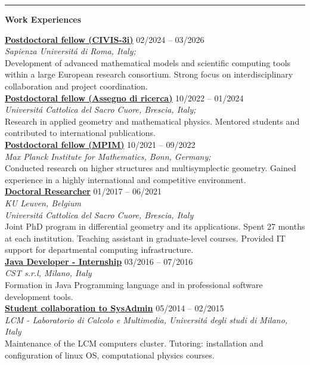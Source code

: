 \documentclass[a4paper]{article}
\newcommand{\block}[1]{\hrule \vspace{0.2cm} \textbf{\Large #1} \vspace{0.2cm}}
\newcommand{\voice}[5]{\href{#4}{\textbf{#1}} \hfill #2 \\ \textit{#3} \\ {\small #5} \vspace{0.2cm} \\}
\begin{document}
\begin{minipage}[t]{0.6\columnwidth}



    \block{Work Experiences}

    \voice{Postdoctoral fellow (CIVIS-3i)}
		{02/2024 -- 03/2026}
		{Sapienza Universit\'a di Roma, Italy;}
		{https://civis3i.univ-amu.fr/en/civis3i-alliance-programme}       
		{Development of advanced mathematical models and scientific computing tools within a large European research consortium. Strong focus on interdisciplinary collaboration and project coordination.}
	\voice{Postdoctoral fellow (Assegno di ricerca)}
		{10/2022 -- 01/2024}
		{Universit\'a Cattolica del Sacro Cuore, Brescia, Italy;}
		{https://dipartimenti.unicatt.it/dmf-home}       
		{Research in applied geometry and mathematical physics. Mentored students and contributed to international publications.}
	\voice{Postdoctoral fellow (MPIM)}
		{10/2021 -- 09/2022}
		{Max Planck Institute for Mathematics, Bonn, Germany;}
		{https://www.mpim-bonn.mpg.de/}       
		 {Conducted research on higher structures and multisymplectic geometry. Gained experience in a highly international and competitive environment.}
        \voice{Doctoral Researcher}
    	{01/2017 -- 06/2021}
    	{KU Leuven, Belgium \\ Universit\'a Cattolica del Sacro Cuore, Brescia, Italy }
    	{https://scuoledidottorato.unicatt.it/phdschools/science-10574.html}
    	{Joint PhD program in differential geometry and its applications. Spent 27 months at each institution.
        Teaching assistant in graduate-level courses. Provided IT support for departmental computing infrastructure.}	
    \voice{Java Developer - Internship}
        {03/2016  -- 07/2016}
        {CST s.r.l, Milano, Italy}
        {https://www.csttech.it/}       
        {Formation in Java Programming language and in professional software development tools.}
    \voice{Student collaboration to SysAdmin}
        {05/2014 -- 02/2015}
        {LCM - Laboratorio di Calcolo e Multimedia, Universit\'a degli studi di Milano, Italy}
        {https://lcm.mi.infn.it/}       
        {Maintenance of the LCM computers cluster. Tutoring: installation and configuration of linux OS, computational physics courses.\vspace{-0.25cm}}
 



















\end{minipage} 
\end{document}
